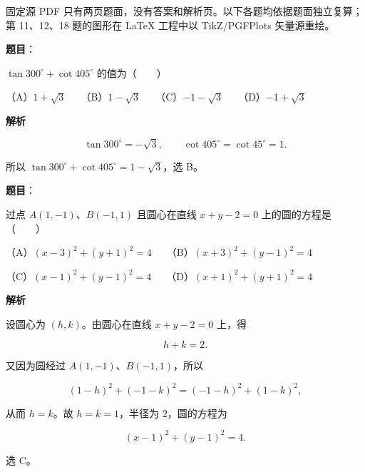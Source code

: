 

\begin{gktip}
固定源 PDF 只有两页题面，没有答案和解析页。以下各题均依据题面独立复算；第 11、12、18 题的图形在 LaTeX 工程中以 TikZ/PGFPlots 矢量源重绘。
\end{gktip}


\begin{answer}

\textbf{题目}：

$\tan300^\circ+\cot405^\circ$ 的值为\mbox{（　　）}

（A）$1+\sqrt3$　　（B）$1-\sqrt3$　　（C）$-1-\sqrt3$　　（D）$-1+\sqrt3$

\textbf{解析}

\nopagebreak[4]
\[
\tan300^\circ=-\sqrt3,\qquad \cot405^\circ=\cot45^\circ=1.
\]

所以 $\tan300^\circ+\cot405^\circ=1-\sqrt3$，选 B。


\end{answer}
\begin{answer}

\textbf{题目}：

过点 $A(1,-1)$、$B(-1,1)$ 且圆心在直线 $x+y-2=0$ 上的圆的方程是\mbox{（　　）}

（A）$(x-3)^2+(y+1)^2=4$　　（B）$(x+3)^2+(y-1)^2=4$

（C）$(x-1)^2+(y-1)^2=4$　　（D）$(x+1)^2+(y+1)^2=4$

\textbf{解析}

设圆心为 $(h,k)$。由圆心在直线 $x+y-2=0$ 上，得

\nopagebreak[4]
\[
h+k=2.
\]

又因为圆经过 $A(1,-1)$、$B(-1,1)$，所以

\nopagebreak[4]
\[
(1-h)^2+(-1-k)^2=(-1-h)^2+(1-k)^2,
\]

从而 $h=k$。故 $h=k=1$，半径为 $2$，圆的方程为

\nopagebreak[4]
\[
(x-1)^2+(y-1)^2=4.
\]

选 C。


\end{answer}
